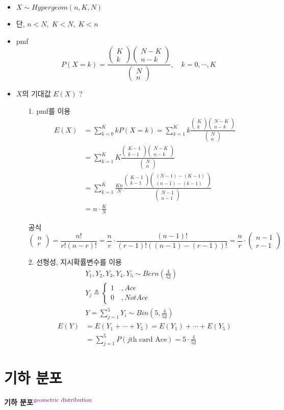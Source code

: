 \documentclass{oblivoir}
\newcommand{\DC}[1]{\textcolor{DarkMagenta}{#1}}%
\newcommand{\UP}[1]{$^{\mbox{\DC{\footnotesize #1}}}$}
\newcommand{\mat}[2]{\begin{pmatrix} #1 \\ #2 \end{pmatrix}}
\begin{document}
\begin{itemize}
\item $X \sim Hypergeom(n, K, N)$
\item 단, $n<N, \; K < N, \; K < n$
\item pmf
$$
P(X=k) = \frac{\mat{K}{k} \mat{N-K}{n-k}}{\mat{N}{n}}, \quad k = 0,\cdots,K
$$
\item $X$의 기대값 $E(X)$ ?
\begin{itemize}
\item[1.] pmf를 이용
\begin{align*}
E(X) &= \sum_{k=0}^K kP(X=k) = \sum_{k=1}^K k \frac{\mat{K}{k}\mat{N-K}{n-k}}{\mat{N}{n}}\\
&= \sum_{k=1}^K K \frac{\mat{K-1}{k-1}\mat{N-K}{n-k}}{\mat{N}{n}}\\
&= \sum_{k=1}^K \frac{Kn}{N} \frac{\mat{K-1}{k-1}\mat{(N-1)-(K-1)}{(n-1)-(k-1)}}{ \mat{N-1}{n-1}}\\
&= n \cdot \frac{K}{N}
\end{align*}
\begin{myframe}{공식}
$$
\mat{n}{r} = \frac{n!}{r!(n-r)!} = \frac{n}{r} \cdot \frac{(n-1)!}{(r-1)!((n-1)-(r-1))!} = \frac{n}{r} \cdot \mat{n-1}{r-1}
$$
\end{myframe}
\item[2.] 선형성, 지시확률변수를 이용
\begin{align*}
&Y_1, Y_2, Y_3, Y_4, Y_5 \sim Bern(\frac{4}{52}) \\
&Y_j \triangleq 
\begin{cases}
1\quad ,Ace  \\
0\quad ,Not Ace
\end{cases} \\
&Y = \sum_{j=1}^5 Y_i \sim Bin(5, \frac{4}{52}) \\
E(Y) &= E(Y_1 + \cdots + Y_5) = E(Y_1) + \cdots + E(Y_5) \\
&= \sum_{j=1}^5 P(\mbox{$j$th card Ace}) = 5 \cdot \frac{4}{52}
\end{align*}
\end{itemize}
\end{itemize}

\section{기하 분포}
\textbf{기하 분포}\UP{geometric distribution}
\end{document}
